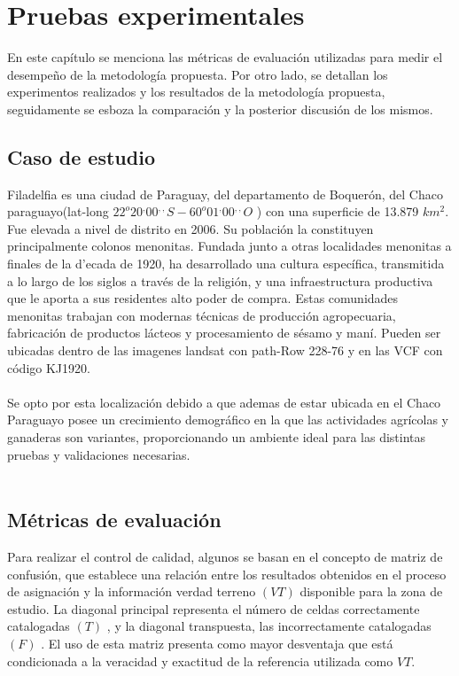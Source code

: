 \newpage{\ } 
\thispagestyle{empty} 

\chapter{Pruebas experimentales}
En este capítulo se menciona las m\'etricas de evaluaci\'on utilizadas para medir el desempe\~{n}o de la metodolog\'ia propuesta. Por otro lado, se detallan los experimentos realizados y los resultados de la metodolog\'ia propuesta, seguidamente se esboza la comparaci\'on y la posterior discusi\'on de los mismos.

\section{Caso de estudio}
Filadelfia es una ciudad de Paraguay, del departamento de Boquer\'on, del Chaco paraguayo(lat-long $22^{o}20^{,}00^{,,} S - 60^{o}01^{,} 00^{,,} O$ ) con una superficie de 13.879 $ km^{2} $. Fue elevada a nivel de distrito en 2006. Su poblaci\'on la constituyen principalmente colonos menonitas. Fundada junto a otras localidades menonitas a finales de la d'ecada de 1920, ha desarrollado una cultura espec\'ifica, transmitida a lo largo de los siglos a trav\'es de la religi\'on, y una infraestructura productiva que le aporta a sus residentes alto poder de compra. Estas comunidades menonitas trabajan con modernas t\'ecnicas de producci\'on agropecuaria, fabricaci\'on de productos l\'acteos y procesamiento de s\'esamo y man\'i. Pueden ser ubicadas dentro de las imagenes landsat con path-Row 228-76 y en las VCF con c\'odigo KJ1920.\\~\\
Se opto por esta localizaci\'on debido a que ademas de estar ubicada en el Chaco Paraguayo posee un crecimiento demogr\'afico en la que las actividades agr\'icolas y ganaderas son variantes, proporcionando un ambiente ideal para las distintas pruebas y validaciones necesarias.\\~\\

\section{Métricas de evaluación}
Para realizar el control de calidad, algunos se basan en el concepto de matriz de confusi\'on, que establece una relaci\'on entre los resultados obtenidos en el proceso de asignaci\'on y la informaci\'on verdad terreno $ (VT) $ disponible para la zona de estudio. La diagonal principal representa el n\'umero de celdas correctamente catalogadas $ (T) $ , y la diagonal transpuesta, las incorrectamente catalogadas $ (F) $ . El uso de esta matriz presenta como mayor desventaja que est\'a condicionada a la veracidad y exactitud de la referencia utilizada como $ VT $.

